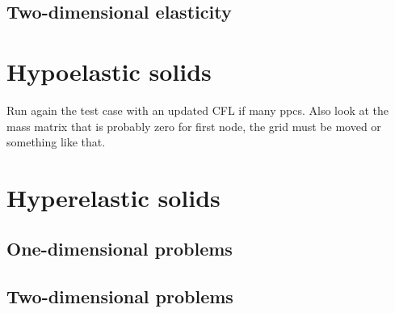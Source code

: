 \subsection{Two-dimensional elasticity}

\section{Hypoelastic solids}
Run again the test case with an updated CFL if many ppcs. Also look at the mass matrix that is probably zero for first node, the grid must be moved or something like that.
\section{Hyperelastic solids}
\subsection{One-dimensional problems}
\subsection{Two-dimensional problems}


